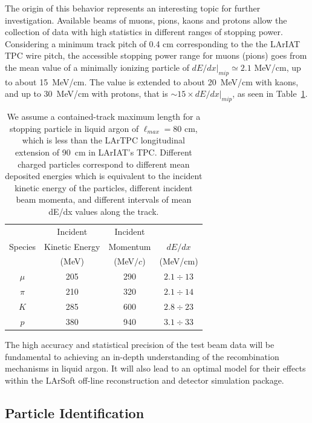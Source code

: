 \documentclass[DIV=calc, paper=a4, fontsize=10pt, twocolumn]{scrartcl}	 %
\begin{document}
{The origin of this behavior represents an interesting topic for further investigation. Available beams of muons, pions, kaons and protons allow the collection of data with high statistics in different ranges of stopping power. Considering a minimum track pitch of 0.4 cm corresponding to the the LArIAT TPC wire pitch, the accessible stopping power range for muons (pions) goes from the mean value of a minimally ionizing particle of $dE/dx|_{mip}\simeq 2.1$  MeV/cm,  up to about 15~MeV/cm.  The value is extended to about 20~MeV/cm with kaons, and up to 30~MeV/cm with protons, that is $\sim 15\times dE/dx|_{mip}$, as seen in Table~\ref{tab:TB}.
\begin{table}[h]
\centering
\begin{tabular}{|c|c|c|c|}
	\hline\hline
              &   Incident            &  Incident       &  \\ 	
 Species&   Kinetic Energy  & Momentum  & $dE/dx$       \\ 	
              &   (MeV)               & (MeV$/c$)    & (MeV/cm)       \\ 	\hline
$\mu$    & 205              & 290   & $2.1\div13$  \\ 
$\pi$      & 210             & 320    & $2.1\div14$  \\ 
$K$        & 285            & 600    &  $2.8\div23$ \\ 
$p$        & 380            & 940     & $3.1\div33$ \\ 
\hline\hline
\end{tabular}
\caption{ {\scriptsize We assume a contained-track maximum length for a stopping particle in liquid argon of $\ell_{max}= 80$ cm, which is less than the LArTPC longitudinal extension of 90~cm in LArIAT's TPC. Different charged particles correspond to different mean deposited energies which is equivalent to the incident kinetic energy of the particles, different incident beam momenta, and different intervals of mean dE/dx values along the track.}  }
\label{tab:TB}
\end{table}
The high accuracy and statistical precision of the test beam data will be fundamental to achieving an in-depth understanding of the recombination mechanisms in liquid argon.  It will also lead to an optimal model for their effects within the LArSoft off-line reconstruction and detector simulation package.
 
\subsection {Particle Identification}

}
\end{document}
